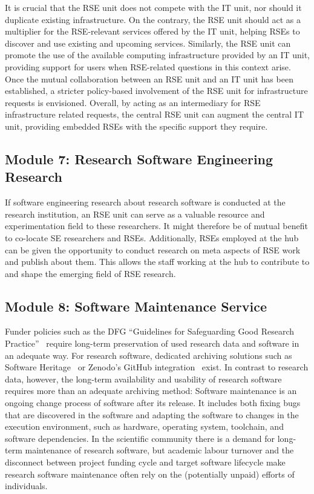 \documentclass[a4paper]{article}
\begin{document}
It is crucial that the RSE unit does not compete with the IT unit, nor should it duplicate existing infrastructure.
On the contrary, the RSE unit should act as a multiplier for the RSE-relevant services offered by the IT unit, helping RSEs to discover and use existing and upcoming services.
Similarly, the RSE unit can promote the use of the available computing infrastructure provided by an IT unit, providing support for users when RSE-related questions in this context arise.
Once the mutual collaboration between an RSE unit and an IT unit has been established, a stricter policy-based involvement of the RSE unit for infrastructure requests is envisioned.
Overall, by acting as an intermediary for RSE infrastructure related requests, the central RSE unit can augment the central IT unit, providing embedded RSEs with the specific support they require.

\subsection{Module 7: Research Software Engineering Research}%
\label{sec:rseresearch}

If software engineering research about research software is conducted at the research institution, an RSE unit can serve as a valuable resource and experimentation field to these researchers.
It might therefore be of mutual benefit to co-locate SE researchers and RSEs.
Additionally, RSEs employed at the hub can be given the opportunity to conduct research on meta aspects of RSE work and publish about them.
This allows the staff working at the hub to contribute to and shape the emerging field of RSE research.

\subsection{Module 8: Software Maintenance Service}%
\label{sec:maintenance}

Funder policies such as the DFG “Guidelines for Safeguarding Good Research Practice”~\autocite{dfg_gsp} require long-term preservation of used research data and software in an adequate way.
For research software, dedicated archiving solutions such as Software Heritage~\autocite{DiCosmo2020,DiCosmo2023} or Zenodo's GitHub integration~\autocite{GitHubZenodo} exist.
In contrast to research data, however, the long-term availability and usability of research software requires more than an adequate archiving method:
Software maintenance is an ongoing change process of software after its release.
It includes both fixing bugs that are discovered in the software and adapting the software to changes in the execution environment, such as hardware, operating system, toolchain, and software dependencies.
In the scientific community there is a demand for long-term maintenance of research software,
 but academic labour turnover and the disconnect between project funding cycle and target software lifecycle make research software maintenance often rely on the (potentially unpaid) efforts of individuals.
\end{document}
